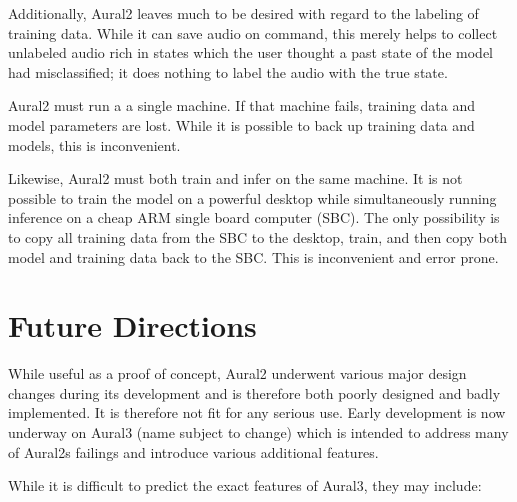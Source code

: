 \documentclass[conference]{IEEEtran}
\begin{document}
Additionally, Aural2 leaves much to be desired with regard to the labeling of training data.
While it can save audio on command, this merely helps to collect unlabeled audio rich in states which the user thought a past state of the model had misclassified; it does nothing to label the audio with the true state.

Aural2 must run a a single machine.
If that machine fails, training data and model parameters are lost.
While it is possible to back up training data and models, this is inconvenient.

Likewise, Aural2 must both train and infer on the same machine.
It is not possible to train the model on a powerful desktop while simultaneously running inference on a cheap ARM single board computer (SBC).
The only possibility is to copy all training data from the SBC to the desktop, train, and then copy both model and training data back to the SBC.
This is inconvenient and error prone.

\section{Future Directions}
While useful as a proof of concept, Aural2 underwent various major design changes during its development and is therefore both poorly designed and badly implemented.
It is therefore not fit for any serious use.
Early development is now underway on Aural3 (name subject to change) which is intended to address many of Aural2s failings and introduce various additional features.

While it is difficult to predict the exact features of Aural3, they may include:
\end{document}
